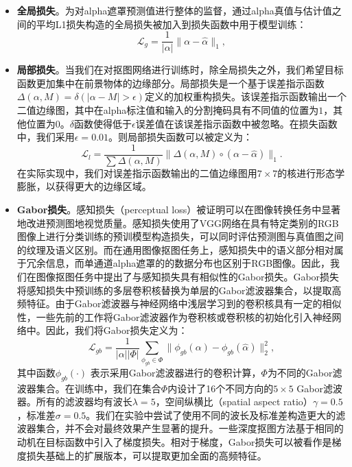 \begin{itemize}
	\item \textbf{全局损失}。为对alpha遮罩预测值进行整体的监督，通过alpha真值与估计值之间的平均L1损失构造的全局损失被加入到损失函数中用于模型训练：
	\begin{equation}
	\mathcal{L}_g = \frac{1}{|\alpha|}\|\alpha-\hat{\alpha}\|_1, 
	\end{equation}

	\item \textbf{局部损失}。当我们在对抠图网络进行训练时，除全局损失之外，我们希望目标函数更加集中在前景物体的边缘部分。局部损失是一个基于误差指示函数$ \Delta(\alpha, M) = \delta(|\alpha - M|>\epsilon) $定义的加权重构损失。该误差指示函数输出一个二值边缘图，其中在alpha标注值和输入的分割掩码具有不同值的位置为$1$，其他位置为$0$。$ \delta $函数使得低于$ \epsilon $误差值在该误差指示函数中被忽略。在损失函数中，我们采用$ \epsilon=0.01 $。则局部损失函数可以被定义为： 
	\begin{equation}
	\mathcal{L}_l = \frac{1}{\sum \Delta(\alpha, M)}\|\Delta(\alpha, M) \circ (\alpha-\hat{\alpha})\|_1.
	\end{equation}
	在实际实现中，我们对误差指示函数输出的二值边缘图用$ 7\times 7 $的核进行形态学膨胀，以获得更大的边缘区域。

	\item \textbf{Gabor损失}。感知损失（perceptual loss）\cite{johnson2016perceptual}被证明可以在图像转换任务中显著地改进预测图地视觉质量。感知损失使用了VGG网络\cite{simonyan2014very}在具有特定类别的RGB图像上进行分类训练的预训模型构造损失，可以同时评估预测图与真值图之间的纹理及语义区别。而在通用图像抠图任务上，感知损失中的语义部分相对属于冗余信息，而单通道alpha遮罩的的数据分布也区别于RGB图像。因此，我们在图像抠图任务中提出了与感知损失具有相似性的Gabor损失。Gabor损失将感知损失中预训练的多层卷积核替换为单层的Gabor滤波器集合，以提取高频特征。由于Gabor滤波器与神经网络中浅层学习到的卷积核具有一定的相似性，一些先前的工作\cite{ouyang2013joint}将Gabor滤波器作为卷积核或卷积核的初始化引入神经网络中。因此，我们将Gabor损失定义为：
	\begin{equation}
	\mathcal{L}_{gb} = \frac{1}{|\alpha||\Phi|}\sum_{\phi_{gb}\in \Phi}\|\phi_{gb}(\alpha)-\phi_{gb}(\hat{\alpha})\|_2^2,
	\end{equation}
	其中函数$ \phi_{gb}(\cdot)$ 表示采用Gabor滤波器进行的卷积计算，$ \Phi $为不同的Gabor滤波器集合。在训练中，我们在集合$ \Phi $内设计了16个不同方向的$5\times5$ Gabor滤波器。所有的滤波器均有波长$\lambda=5$，空间纵横比（spatial aspect ratio）$\gamma=0.5$，标准差$\sigma=0.5$。我们在实验中尝试了使用不同的波长及标准差构造更大的滤波器集合，并不会对最终效果产生显著的提升。一些深度抠图方法基于相同的动机在目标函数中引入了梯度损失\cite{levinshtein2018real,chen2019boundary,samplenet}。相对于梯度，Gabor损失可以被看作是梯度损失基础上的扩展版本，可以提取更加全面的高频特征。
\end{itemize}


